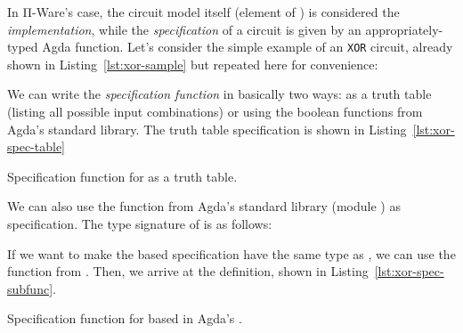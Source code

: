             In Π-Ware's case, the circuit model itself (element of ) is considered the \emph{implementation},
            while the \emph{specification} of a circuit is given by an appropriately-typed Agda function.
            Let's consider the simple example of an \texttt{XOR} circuit,
            already shown in Listing~\ref{lst:xor-sample} but repeated here for convenience:

            \begin{center}
            \end{center}

            We can write the \emph{specification function} in basically two ways: as a truth table
            (listing all possible input combinations) or using the boolean functions
            from Agda's standard library.
            The truth table specification is shown in Listing~\ref{lst:xor-spec-table}

            \begin{listing}[h]
                \caption{Specification function for  as a truth table.\label{lst:xor-spec-table}}
            \end{listing}

            We can also use the  function from Agda's standard library
            (module ) as specification. The type signature of  is as follows:

            \begin{center}
                 \AY{:}     
            \end{center}

            If we want to make the  based specification have the same type as
            , we can use the  function from .
            Then, we arrive at the  definition, shown in Listing~\ref{lst:xor-spec-subfunc}.

            \begin{listing}[h]
                \caption{Specification function for  based in Agda's .
                    \label{lst:xor-spec-subfunc}}
            \end{listing}

